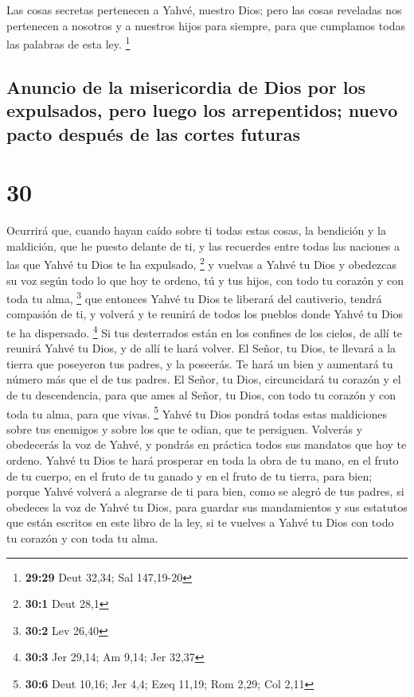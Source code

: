  Las cosas secretas pertenecen a Yahvé, nuestro Dios;
pero las cosas reveladas nos pertenecen a nosotros y a nuestros hijos
para siempre, para que cumplamos todas las palabras de esta ley.
\footnote{\textbf{29:29} Deut 32,34; Sal 147,19-20}

\hypertarget{anuncio-de-la-misericordia-de-dios-por-los-expulsados-pero-luego-los-arrepentidos-nuevo-pacto-despuuxe9s-de-las-cortes-futuras}{%
\subsection{Anuncio de la misericordia de Dios por los expulsados, pero
luego los arrepentidos; nuevo pacto después de las cortes
futuras}\label{anuncio-de-la-misericordia-de-dios-por-los-expulsados-pero-luego-los-arrepentidos-nuevo-pacto-despuuxe9s-de-las-cortes-futuras}}

\hypertarget{section-29}{%
\section{30}\label{section-29}}

 Ocurrirá que, cuando hayan caído sobre ti todas estas
cosas, la bendición y la maldición, que he puesto delante de ti, y las
recuerdes entre todas las naciones a las que Yahvé tu Dios te ha
expulsado, \footnote{\textbf{30:1} Deut 28,1}  y vuelvas a
Yahvé tu Dios y obedezcas su voz según todo lo que hoy te ordeno, tú y
tus hijos, con todo tu corazón y con toda tu alma, \footnote{\textbf{30:2}
  Lev 26,40}  que entonces Yahvé tu Dios te liberará del
cautiverio, tendrá compasión de ti, y volverá y te reunirá de todos los
pueblos donde Yahvé tu Dios te ha dispersado. \footnote{\textbf{30:3}
  Jer 29,14; Am 9,14; Jer 32,37}  Si tus desterrados están
en los confines de los cielos, de allí te reunirá Yahvé tu Dios, y de
allí te hará volver.  El Señor, tu Dios, te llevará a la
tierra que poseyeron tus padres, y la poseerás. Te hará un bien y
aumentará tu número más que el de tus padres.  El Señor,
tu Dios, circuncidará tu corazón y el de tu descendencia, para que ames
al Señor, tu Dios, con todo tu corazón y con toda tu alma, para que
vivas. \footnote{\textbf{30:6} Deut 10,16; Jer 4,4; Ezeq 11,19; Rom
  2,29; Col 2,11}  Yahvé tu Dios pondrá todas estas
maldiciones sobre tus enemigos y sobre los que te odian, que te
persiguen.  Volverás y obedecerás la voz de Yahvé, y
pondrás en práctica todos sus mandatos que hoy te ordeno. 
Yahvé tu Dios te hará prosperar en toda la obra de tu mano, en el fruto
de tu cuerpo, en el fruto de tu ganado y en el fruto de tu tierra, para
bien; porque Yahvé volverá a alegrarse de ti para bien, como se alegró
de tus padres,  si obedeces la voz de Yahvé tu Dios, para
guardar sus mandamientos y sus estatutos que están escritos en este
libro de la ley, si te vuelves a Yahvé tu Dios con todo tu corazón y con
toda tu alma.


